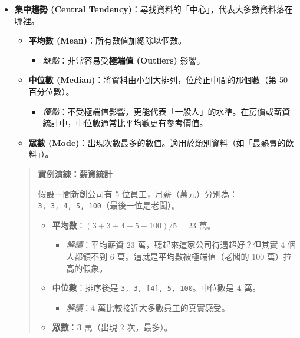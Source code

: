 \documentclass[
  letterpaper,
  DIV=11,
  numbers=noendperiod]{scrreprt}
\providecommand{\tightlist}{%
  \setlength{\itemsep}{0pt}\setlength{\parskip}{0pt}}
\begin{document}
\begin{itemize}
\tightlist
\item
  \textbf{集中趨勢 (Central
  Tendency)}：尋找資料的「中心」，代表大多數資料落在哪裡。

  \begin{itemize}
  \tightlist
  \item
    \textbf{平均數 (Mean)}：所有數值加總除以個數。

    \begin{itemize}
    \tightlist
    \item
      \emph{缺點}：非常容易受\textbf{極端值 (Outliers)} 影響。
    \end{itemize}
  \item
    \textbf{中位數 (Median)}：將資料由小到大排列，位於正中間的那個數（第
    50 百分位數）。

    \begin{itemize}
    \tightlist
    \item
      \emph{優點}：不受極端值影響，更能代表「一般人」的水準。在房價或薪資統計中，中位數通常比平均數更有參考價值。
    \end{itemize}
  \item
    \textbf{眾數
    (Mode)}：出現次數最多的數值。適用於類別資料（如「最熱賣的飲料」）。
  \end{itemize}

  \begin{quote}
  \textbf{實例演練：薪資統計}

  假設一間新創公司有 5
  位員工，月薪（萬元）分別為：\texttt{3,\ 3,\ 4,\ 5,\ 100}（最後一位是老闆）。

  \begin{itemize}
  \tightlist
  \item
    \textbf{平均數}：\((3+3+4+5+100) / 5 = 23\) 萬。

    \begin{itemize}
    \tightlist
    \item
      \emph{解讀}：平均薪資 23 萬，聽起來這家公司待遇超好？但其實 4
      個人都領不到 6 萬。這就是平均數被極端值（老闆的 100
      萬）拉高的假象。
    \end{itemize}
  \item
    \textbf{中位數}：排序後是
    \texttt{3,\ 3,\ {[}4{]},\ 5,\ 100}。中位數是 \textbf{4} 萬。

    \begin{itemize}
    \tightlist
    \item
      \emph{解讀}：4 萬比較接近大多數員工的真實感受。
    \end{itemize}
  \item
    \textbf{眾數}：\textbf{3} 萬（出現 2 次，最多）。


\end{itemize}
\end{quote}
\end{itemize}
\end{document}
